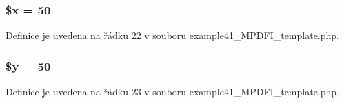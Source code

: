 \hypertarget{example41___m_p_d_f_i__template_8php_af3a16c5f0dd7a74cf9acf6a49fff73a7}{
\subsubsection[{\$x}]{\setlength{\rightskip}{0pt plus 5cm}\$x = 50}}\label{example41___m_p_d_f_i__template_8php_af3a16c5f0dd7a74cf9acf6a49fff73a7}


Definice je uvedena na řádku 22 v souboru example41\-\_\-\-M\-P\-D\-F\-I\-\_\-template.\-php.

\hypertarget{example41___m_p_d_f_i__template_8php_a77b973d137fb33212e018b042df6e3e7}{
\subsubsection[{\$y}]{\setlength{\rightskip}{0pt plus 5cm}\${\bf y} = 50}}\label{example41___m_p_d_f_i__template_8php_a77b973d137fb33212e018b042df6e3e7}


Definice je uvedena na řádku 23 v souboru example41\-\_\-\-M\-P\-D\-F\-I\-\_\-template.\-php.



